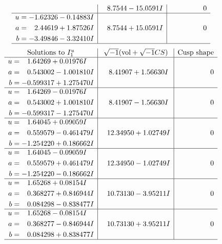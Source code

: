 \documentclass[1p]{elsarticle_modified}
\theoremstyle{definition}
\newcommand{\I}{\sqrt{-1}}
\begin{document}
$$\begin{array}{c|c|c}
 & \phantom{-}8.7544 - 15.0591 I & \phantom{-0.000000 } 0 \\ \hline\begin{aligned}
u &= -1.62326 - 0.14883 I \\
a &= \phantom{-}2.44619 + 1.87526 I \\
b &= -3.49846 - 3.32410 I\end{aligned}
 & \phantom{-}8.7544 + 15.0591 I & \phantom{-0.000000 } 0\\
 \hline 
 \end{array}$$\newpage$$\begin{array}{c|c|c}  
\text{Solutions to }I^u_{1}& \I (\text{vol} + \sqrt{-1}CS) & \text{Cusp shape}\\
 \hline 
\begin{aligned}
u &= \phantom{-}1.64269 + 0.01976 I \\
a &= \phantom{-}0.543002 - 1.001810 I \\
b &= -0.599317 + 1.275470 I\end{aligned}
 & \phantom{-}8.41907 + 1.56630 I & \phantom{-0.000000 } 0 \\ \hline\begin{aligned}
u &= \phantom{-}1.64269 - 0.01976 I \\
a &= \phantom{-}0.543002 + 1.001810 I \\
b &= -0.599317 - 1.275470 I\end{aligned}
 & \phantom{-}8.41907 - 1.56630 I & \phantom{-0.000000 } 0 \\ \hline\begin{aligned}
u &= \phantom{-}1.64045 + 0.09059 I \\
a &= \phantom{-}0.559579 - 0.461479 I \\
b &= -1.254220 + 0.186662 I\end{aligned}
 & \phantom{-}12.34950 + 1.02749 I & \phantom{-0.000000 } 0 \\ \hline\begin{aligned}
u &= \phantom{-}1.64045 - 0.09059 I \\
a &= \phantom{-}0.559579 + 0.461479 I \\
b &= -1.254220 - 0.186662 I\end{aligned}
 & \phantom{-}12.34950 - 1.02749 I & \phantom{-0.000000 } 0 \\ \hline\begin{aligned}
u &= \phantom{-}1.65268 + 0.08154 I \\
a &= \phantom{-}0.368277 + 0.846944 I \\
b &= \phantom{-}0.084298 - 0.838477 I\end{aligned}
 & \phantom{-}10.73130 - 3.95211 I & \phantom{-0.000000 } 0 \\ \hline\begin{aligned}
u &= \phantom{-}1.65268 - 0.08154 I \\
a &= \phantom{-}0.368277 - 0.846944 I \\
b &= \phantom{-}0.084298 + 0.838477 I\end{aligned}
 & \phantom{-}10.73130 + 3.95211 I & \phantom{-0.000000 } 0\\
 \hline 
 \end{array}$$\newpage\newpage\renewcommand{\arraystretch}{1}
\end{document}

